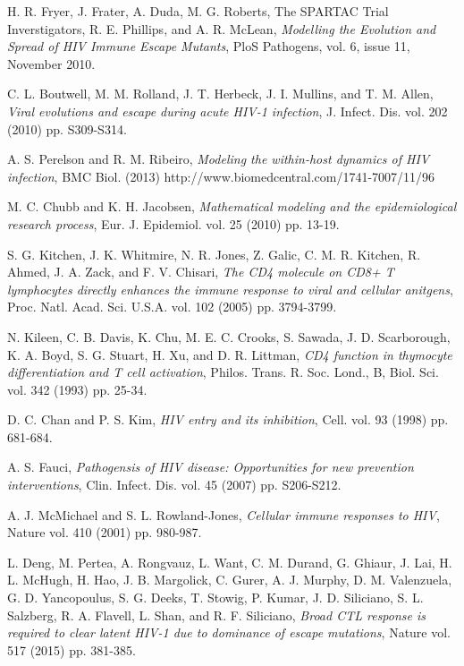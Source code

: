 \documentclass[11pt, oneside]{article}    %
\begin{document}
\begin{thebibliography}{99}
H. R. Fryer, J. Frater, A. Duda, M. G. Roberts, The SPARTAC Trial Inverstigators, R. E. Phillips, and A. R. McLean, {\em Modelling the Evolution and Spread of HIV Immune Escape Mutants}, PloS Pathogens, vol. 6, issue 11, November 2010.

C. L. Boutwell, M. M. Rolland, J. T. Herbeck, J. I. Mullins, and T. M. Allen,  {\em Viral evolutions and escape during acute HIV-1 infection}, J. Infect. Dis. vol. 202 (2010) pp. S309-S314.

A. S. Perelson and  R. M. Ribeiro, {\em Modeling the within-host dynamics of HIV infection}, BMC Biol. (2013) http://www.biomedcentral.com/1741-7007/11/96

M. C. Chubb and K. H. Jacobsen,  {\em Mathematical modeling and the epidemiological research process}, Eur. J. Epidemiol. vol. 25 (2010) pp. 13-19.

S. G. Kitchen, J. K. Whitmire, N. R. Jones, Z. Galic, C. M. R. Kitchen, R. Ahmed, J. A. Zack, and F. V. Chisari,  {\em The CD4 molecule on CD8+ T lymphocytes directly enhances the immune response to viral and cellular anitgens}, Proc. Natl. Acad. Sci. U.S.A. vol. 102 (2005) pp. 3794-3799.

N. Kileen, C. B. Davis, K. Chu, M. E. C. Crooks, S. Sawada, J. D. Scarborough, K. A. Boyd, S. G. Stuart, H. Xu, and D. R. Littman, {\em CD4 function in thymocyte differentiation and T cell activation}, Philos. Trans. R. Soc. Lond., B, Biol. Sci. vol. 342 (1993) pp. 25-34.

D. C. Chan and P. S. Kim, {\em HIV entry and its inhibition}, Cell. vol. 93 (1998) pp. 681-684.

A. S. Fauci, {\em Pathogensis of HIV disease: Opportunities for new prevention interventions}, Clin. Infect. Dis. vol. 45 (2007) pp. S206-S212.

A. J. McMichael and S. L. Rowland-Jones, {\em Cellular immune responses to HIV}, Nature vol. 410 (2001) pp. 980-987.

L. Deng, M. Pertea, A. Rongvauz, L. Want, C. M. Durand, G. Ghiaur, J. Lai, H. L. McHugh, H. Hao, J. B. Margolick, C. Gurer, A. J. Murphy, D. M. Valenzuela, G. D. Yancopoulus, S. G. Deeks, T. Stowig, P. Kumar, J. D. Siliciano, S. L. Salzberg, R. A. Flavell, L. Shan, and R. F. Siliciano, {\em Broad CTL response is required to clear latent HIV-1 due to dominance of escape mutations}, Nature vol. 517 (2015) pp. 381-385.


\end{thebibliography}
\end{document}
